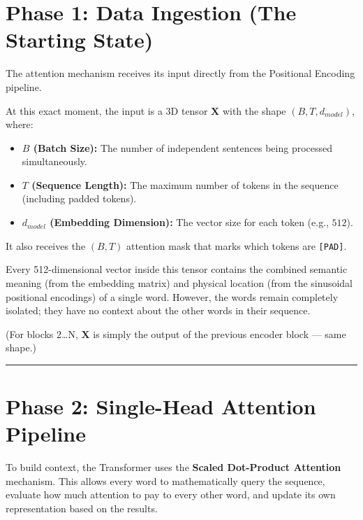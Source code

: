 \documentclass[11pt,a4paper,oneside]{report}
\providecommand{\tightlist}{\setlength{\itemsep}{0pt}\setlength{\parskip}{0pt}}
\begin{document}
\section{Phase 1: Data Ingestion (The Starting State)}\label{phase-1-data-ingestion-the-starting-state}

The attention mechanism receives its input directly from the Positional Encoding pipeline.

At this exact moment, the input is a 3D tensor \(\mathbf{X}\) with the shape \textbf{\((B, T, d_{model})\)}, where:

\begin{itemize}
\tightlist
\item
  \textbf{\(B\) (Batch Size):} The number of independent sentences being processed simultaneously.
\item
  \textbf{\(T\) (Sequence Length):} The maximum number of tokens in the sequence (including padded tokens).
\item
  \textbf{\(d_{model}\) (Embedding Dimension):} The vector size for each token (e.g., \(512\)).
\end{itemize}

It also receives the \((B, T)\) attention mask that marks which tokens are \texttt{{[}PAD{]}}.

Every 512-dimensional vector inside this tensor contains the combined semantic meaning (from the embedding matrix) and physical location (from the sinusoidal positional encodings) of a single word. However, the words remain completely isolated; they have no context about the other words in their sequence.

(For blocks 2\ldots N, \(\mathbf{X}\) is simply the output of the previous encoder block --- same shape.)

\begin{center}\rule{0.5\linewidth}{0.5pt}\end{center}

\section{Phase 2: Single-Head Attention Pipeline}\label{phase-2-single-head-attention-pipeline}

To build context, the Transformer uses the \textbf{Scaled Dot-Product Attention} mechanism. This allows every word to mathematically query the sequence, evaluate how much attention to pay to every other word, and update its own representation based on the results.
\end{document}
